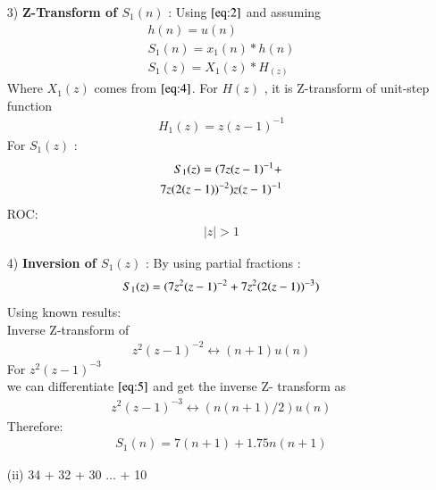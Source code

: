 \documentclass[journal,12pt,twocolumn]{IEEEtran}
\theoremstyle{remark}
\begin{document}
\begin{enumerate}
\vspace{0.7cm}
\item[3)]
\textbf{Z-Transform of $S_1(n)$} :
Using $\eqref{eq:2}$ and assuming 
\begin{align}
         h(n)=u(n) \\
    S_1(n) = x_1(n) * h(n) \\
    S_1(z) = X_1(z) * H_(z)
    \end{align}
    Where $X_1(z)$ comes from $\eqref{eq:4}$.
    \vspace{0.05cm}
    For $H(z)$ , it is Z-transform of unit-step function
    \begin{align}
        H_1(z) = z(z-1)^{-1} \label{eq:9}
    \end{align}
    For $S_1(z)$ :
    \begin{align}
            S_1(z) = \notag(7z(z-1)^{-1}+\\
7z(2(z-1))^{-2})z(z-1)^{-1}
    \end{align}
    ROC:
    \begin{align} 
    \lvert z \rvert > 1
    \end{align}
    
    \item[4)]
\textbf{Inversion of $S_1(z)$} :
By using partial fractions :
\begin{align}
    S_1(z) = \notag(7z^2(z-1)^{-2} + 7z^2(2(z-1))^{-3}) 
\end{align}
Using known results:\\
  Inverse Z-transform of
\begin{align}
        z^2(z-1)^{-2} \leftrightarrow (n+1)u(n)\label{eq:5}
\end{align}
    For $z^2(z-1)^{-3}$\\
    
    we can differentiate $\eqref{eq:5}$ and get the inverse Z- transform as 
    \begin{align}
          z^2(z-1)^{-3} \leftrightarrow (n(n+1)/2)u(n) \label{eq:7}
    \end{align}
    Therefore:
\begin{align}
 S_1(n) = 7(n+1) + 1.75n(n+1)   
\end{align}

    











\vspace{0.5cm}
\item[(ii)]
 34 + 32 + 30 ... + 10\vspace{0.05cm}
\vspace{0.2cm}


\end{enumerate}
\end{document}
